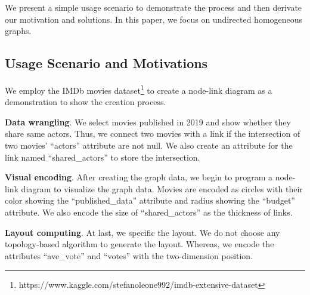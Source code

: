 We present a simple usage scenario to demonstrate the process and then derivate our motivation and solutions.
In this paper, we focus on undirected homogeneous graphs.


\subsection{Usage Scenario and Motivations}

We employ the IMDb movies dataset\footnote{https://www.kaggle.com/stefanoleone992/imdb-extensive-dataset} to create a node-link diagram as a demonstration to show the creation process.

\textbf{Data wrangling}. 
We select movies published in 2019 and show whether they share same actors.
Thus, we connect two movies with a link if the intersection of two movies' ``actors'' attribute are not null.
We also create an attribute for the link named ``shared\_actors'' to store the intersection.

\textbf{Visual encoding}.
After creating the graph data, we begin to program a node-link diagram to visualize the graph data.
Movies are encoded as circles with their color showing the ``published\_data'' attribute and radius showing the ``budget'' attribute.
We also encode the size of ``shared\_actors'' as the thickness of links.

\textbf{Layout computing}.
At last, we specific the layout. We do not choose any topology-based algorithm to generate the layout. 
Whereas, we encode the attributes ``ave\_vote'' and ``votes'' with the two-dimension position.

